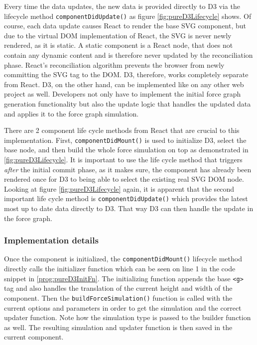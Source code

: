 Every time the data updates, the new data is provided directly to D3 via the lifecycle method \texttt{componentDidUpdate()} as figure \ref{fig:pureD3Lifecycle} shows. Of course, each data update causes React to render the base SVG component, but due to the virtual DOM implementation of React, the SVG is never newly rendered, as it is static. A static component is a React node, that does not contain any dynamic content and is therefore never updated by the reconciliation phase. React's reconciliation algorithm prevents the browser from newly committing the SVG tag to the DOM. D3, therefore, works completely separate from React. D3, on the other hand, can be implemented like on any other web project as well. Developers not only have to implement the initial force graph generation functionality but also the update logic that handles the updated data and applies it to the force graph simulation.

There are 2 component life cycle methods from React that are crucial to this implementation. First, \texttt{componentDidMount()} is used to initialize D3, select the base node, and then build the whole force simulation on top as demonstrated in \ref{fig:pureD3Lifecycle}. It is important to use the life cycle method that triggers \emph{after} the initial commit phase, as it makes sure, the component has already been rendered once for D3 to being able to select the existing real SVG DOM node. Looking at figure \ref{fig:pureD3Lifecycle} again, it is apparent that the second important life cycle method is \texttt{componentDidUpdate()} which provides the latest most up to date data directly to D3. That way D3 can then handle the update in the force graph.

\subsubsection{Implementation details}

Once the component is initialized, the \texttt{componentDidMount()} lifecycle method directly calls the initializer function which can be seen on line 1 in the code snippet in \ref{prog:pureD3InitFn}. The initializing function appends the base \texttt{<g>} tag and also handles the translation of the current height and width of the component. Then the \texttt{buildForceSimulation()} function is called with the current options and parameters in order to get the simulation and the correct updater function. Note how the simulation type is passed to the builder function as well. The resulting simulation and updater function is then saved in the current component.

